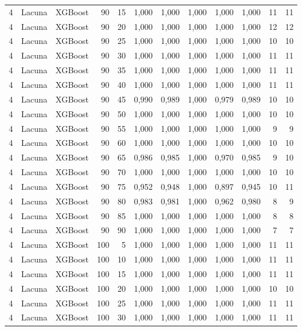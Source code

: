 \begin{longtable}{@{}rllrrrrrrrrr@{}}
4 & Lacuna & XGBoost & 90 & 15 & 1,000 & 1,000 & 1,000 & 1,000 & 1,000 & 11 & 11 \\
4 & Lacuna & XGBoost & 90 & 20 & 1,000 & 1,000 & 1,000 & 1,000 & 1,000 & 12 & 12 \\
4 & Lacuna & XGBoost & 90 & 25 & 1,000 & 1,000 & 1,000 & 1,000 & 1,000 & 10 & 10 \\
4 & Lacuna & XGBoost & 90 & 30 & 1,000 & 1,000 & 1,000 & 1,000 & 1,000 & 11 & 11 \\
4 & Lacuna & XGBoost & 90 & 35 & 1,000 & 1,000 & 1,000 & 1,000 & 1,000 & 11 & 11 \\
4 & Lacuna & XGBoost & 90 & 40 & 1,000 & 1,000 & 1,000 & 1,000 & 1,000 & 11 & 11 \\
4 & Lacuna & XGBoost & 90 & 45 & 0,990 & 0,989 & 1,000 & 0,979 & 0,989 & 10 & 10 \\
4 & Lacuna & XGBoost & 90 & 50 & 1,000 & 1,000 & 1,000 & 1,000 & 1,000 & 10 & 10 \\
4 & Lacuna & XGBoost & 90 & 55 & 1,000 & 1,000 & 1,000 & 1,000 & 1,000 & 9 & 9 \\
4 & Lacuna & XGBoost & 90 & 60 & 1,000 & 1,000 & 1,000 & 1,000 & 1,000 & 10 & 10 \\
4 & Lacuna & XGBoost & 90 & 65 & 0,986 & 0,985 & 1,000 & 0,970 & 0,985 & 9 & 10 \\
4 & Lacuna & XGBoost & 90 & 70 & 1,000 & 1,000 & 1,000 & 1,000 & 1,000 & 10 & 10 \\
4 & Lacuna & XGBoost & 90 & 75 & 0,952 & 0,948 & 1,000 & 0,897 & 0,945 & 10 & 11 \\
4 & Lacuna & XGBoost & 90 & 80 & 0,983 & 0,981 & 1,000 & 0,962 & 0,980 & 8 & 9 \\
4 & Lacuna & XGBoost & 90 & 85 & 1,000 & 1,000 & 1,000 & 1,000 & 1,000 & 8 & 8 \\
4 & Lacuna & XGBoost & 90 & 90 & 1,000 & 1,000 & 1,000 & 1,000 & 1,000 & 7 & 7 \\
4 & Lacuna & XGBoost & 100 & 5 & 1,000 & 1,000 & 1,000 & 1,000 & 1,000 & 11 & 11 \\
4 & Lacuna & XGBoost & 100 & 10 & 1,000 & 1,000 & 1,000 & 1,000 & 1,000 & 11 & 11 \\
4 & Lacuna & XGBoost & 100 & 15 & 1,000 & 1,000 & 1,000 & 1,000 & 1,000 & 11 & 11 \\
4 & Lacuna & XGBoost & 100 & 20 & 1,000 & 1,000 & 1,000 & 1,000 & 1,000 & 10 & 10 \\
4 & Lacuna & XGBoost & 100 & 25 & 1,000 & 1,000 & 1,000 & 1,000 & 1,000 & 11 & 11 \\
4 & Lacuna & XGBoost & 100 & 30 & 1,000 & 1,000 & 1,000 & 1,000 & 1,000 & 11 & 11 \\

\end{longtable}
